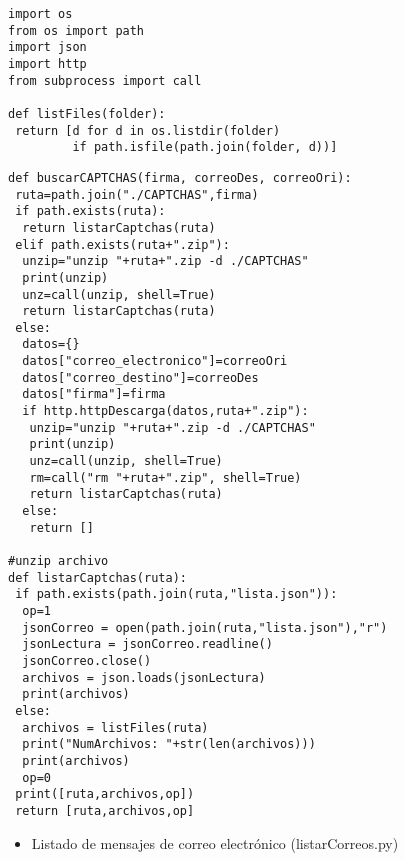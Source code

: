 \begin{lstlisting}[frame=single]
import os
from os import path
import json
import http
from subprocess import call

def listFiles(folder):
 return [d for d in os.listdir(folder) 
         if path.isfile(path.join(folder, d))]
\end{lstlisting}
\begin{lstlisting}[frame=single]
def buscarCAPTCHAS(firma, correoDes, correoOri):
 ruta=path.join("./CAPTCHAS",firma)
 if path.exists(ruta):
  return listarCaptchas(ruta)
 elif path.exists(ruta+".zip"):
  unzip="unzip "+ruta+".zip -d ./CAPTCHAS"
  print(unzip)
  unz=call(unzip, shell=True)
  return listarCaptchas(ruta)
 else:
  datos={}
  datos["correo_electronico"]=correoOri
  datos["correo_destino"]=correoDes
  datos["firma"]=firma
  if http.httpDescarga(datos,ruta+".zip"):
   unzip="unzip "+ruta+".zip -d ./CAPTCHAS"
   print(unzip)
   unz=call(unzip, shell=True)
   rm=call("rm "+ruta+".zip", shell=True)
   return listarCaptchas(ruta)
  else:
   return []

#unzip archivo
def listarCaptchas(ruta):
 if path.exists(path.join(ruta,"lista.json")):
  op=1
  jsonCorreo = open(path.join(ruta,"lista.json"),"r")
  jsonLectura = jsonCorreo.readline()
  jsonCorreo.close()
  archivos = json.loads(jsonLectura)
  print(archivos)
 else:
  archivos = listFiles(ruta)
  print("NumArchivos: "+str(len(archivos)))
  print(archivos)
  op=0
 print([ruta,archivos,op])
 return [ruta,archivos,op]
\end{lstlisting}
\pagebreak
\begin{itemize}
\item Listado de mensajes de correo electrónico (listarCorreos.py)
\end{itemize}

